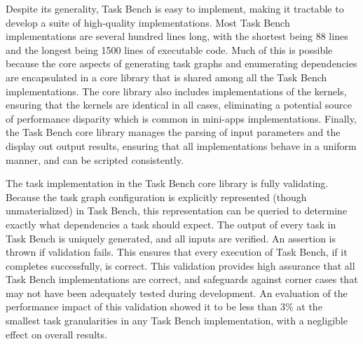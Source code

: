 Despite its generality, Task Bench is easy to implement, making it
tractable to develop a suite of high-quality implementations. Most
Task Bench implementations are several hundred lines long, with the
shortest being 88 lines and the longest being 1500 lines of executable
code. Much of this is possible because the core aspects of generating
task graphs and enumerating dependencies are encapsulated in a core
library that is shared among all the Task Bench implementations. The
core library also includes implementations of the kernels, ensuring
that the kernels are identical in all cases, eliminating a potential
source of performance disparity which is common in mini-apps
implementations. Finally, the Task Bench core library manages the
parsing of input parameters and the display out output results,
ensuring that all implementations behave in a uniform manner, and can
be scripted consistently.

The task implementation in the Task Bench core library is fully
validating. Because the task graph configuration is explicitly
represented (though unmaterialized) in Task Bench, this representation
can be queried to determine exactly what dependencies a task should
expect. The output of every task in Task Bench is uniquely generated,
and all inputs are verified. An assertion is thrown if validation
fails. This ensures that every execution of Task Bench, if it
completes successfully, is correct. This validation provides high
assurance that all Task Bench implementations are correct, and
safeguards against corner cases that may not have been adequately
tested during development. An evaluation of the performance impact of
this validation showed it to be less than 3\% at the smallest task
granularities in any Task Bench implementation, with a negligible
effect on overall results.
